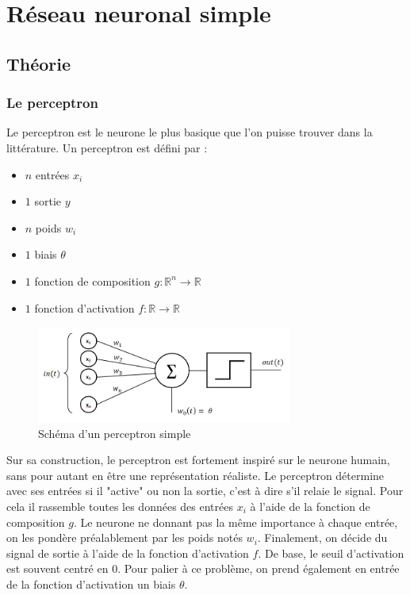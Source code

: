
\chapter{Réseau neuronal simple}

\section{Théorie}

\subsection{Le perceptron}

Le perceptron est le neurone le plus basique que l'on puisse trouver dans la
littérature. Un perceptron est défini par :

\begin{itemize}
  \item $n$ entrées $x_i$
  \item $1$ sortie $y$
  \item $n$ poids $w_i$
  \item $1$ biais $\theta$
  \item $1$ fonction de composition $g : \mathbb{R}^n \to \mathbb{R}$
  \item $1$ fonction d'activation $f : \mathbb{R} \to \mathbb{R}$
\end{itemize}

\begin{figure}[!ht]
\begin{center}
\includegraphics[width=0.75\textwidth]{images/perceptron.png}
\end{center}
\caption{Schéma d'un perceptron simple}
\end{figure}

\vspace{\parskip}
Sur sa construction, le perceptron est fortement inspiré sur le neurone humain,
sans pour autant en être une représentation réaliste.
Le perceptron détermine avec ses entrées si il "active" ou non la sortie, c'est
à dire s'il relaie le signal. Pour cela il rassemble toutes les données des
entrées $x_i$ à l'aide de la fonction de composition $g$. Le neurone ne donnant
pas la même importance à chaque entrée, on les pondère préalablement par les
poids notés $w_i$.
Finalement, on décide du signal de sortie à l'aide de la fonction d'activation
$f$. De base, le seuil d'activation est souvent centré en $0$. Pour palier à ce
problème, on prend également en entrée de la fonction d'activation un biais
$\theta$.

